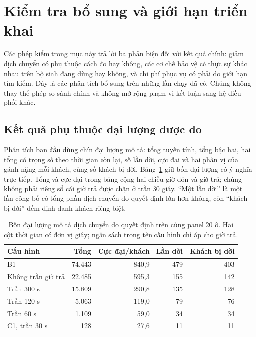 \section{Kiểm tra bổ sung và giới hạn triển khai}
\label{muc:kiemtraphu}

Các phép kiểm trong mục này trả lời ba phản biện đối với kết quả chính: giảm dịch chuyển
có phụ thuộc cách đo hay không, các cơ chế bảo vệ có thực sự khác nhau trên bộ sinh đang
dùng hay không, và chi phí phục vụ có phải do giới hạn tìm kiếm. Đây là các phân tích bổ
sung trên những lần chạy đã có. Chúng không thay thế phép so sánh chính và không mở rộng
phạm vi kết luận sang hệ điều phối khác.

\subsection{Kết quả phụ thuộc đại lượng được đo}


Phân tích ban đầu dùng chín đại lượng mô tả: tổng tuyến tính, tổng bậc hai, hai tổng có
trọng số theo thời gian còn lại, số lần dời, cực đại và hai phân vị của gánh nặng mỗi khách,
cùng số khách bị dời. Bảng~\ref{bang:kiemtra-thuocdo} giữ bốn đại lượng có ý nghĩa trực
tiếp. Tổng và cực đại trong bảng cộng hai chiều giờ đón và giờ trả; chúng không phải riêng
sổ cái giờ trả được chặn ở trần 30 giây. ``Một lần dời'' là một lần công bố có tổng phần
dịch chuyển do quyết định lớn hơn không, còn ``khách bị dời'' đếm định danh khách riêng biệt.

\begin{table}[htbp]
\centering
\caption{Bốn đại lượng mô tả dịch chuyển do quyết định trên cùng panel 20 ô.
Hai cột thời gian có đơn vị giây; ngân sách trong tên cấu hình chỉ áp cho giờ trả.}
\label{bang:kiemtra-thuocdo}
\small
\begin{tabular}{@{}lrrrr@{}}
\toprule
\textbf{Cấu hình} & \textbf{Tổng} & \textbf{Cực đại/khách} & \textbf{Lần dời} & \textbf{Khách bị dời}\\
\midrule
B1 & 74.443 & 840{,}9 & 479 & 403\\
Không trần giờ trả & 22.485 & 595{,}3 & 155 & 142\\
Trần 300 s & 15.809 & 290{,}8 & 135 & 128\\
Trần 120 s & 5.063 & 119{,}0 & 79 & 76\\
Trần 60 s & 1.109 & 59{,}0 & 34 & 34\\
C1, trần 30 s & 128 & 27{,}6 & 11 & 11\\
\bottomrule
\end{tabular}
\end{table}

